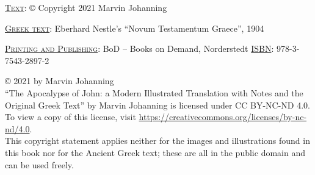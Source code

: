 \thispagestyle{empty}
\vspace*{\fill}
\noindent\textsc{\underline{Text}}: © Copyright 2021 Marvin Johanning

\noindent\textsc{\underline{Greek text}}: Eberhard Nestle's ``Novum Testamentum Graece'', 1904


\noindent\textsc{\underline{Printing and Publishing}}: BoD – Books on Demand, Norderstedt
\noindent\textsc{\underline{ISBN}}: 978-3-7543-2897-2

\bigskip

\noindent© 2021 by Marvin Johanning \ccbyncnd\\``The Apocalypse of John: a Modern Illustrated Translation with Notes and the Original Greek Text'' by Marvin Johanning is licensed under CC BY-NC-ND 4.0. To view a copy of this license, visit \url{https://creativecommons.org/licenses/by-nc-nd/4.0}.\\This copyright statement applies neither for the images and illustrations found in this book nor for the Ancient Greek text; these are all in the public domain and can be used freely.

\vspace{30mm}
\noindent{}
\newpage